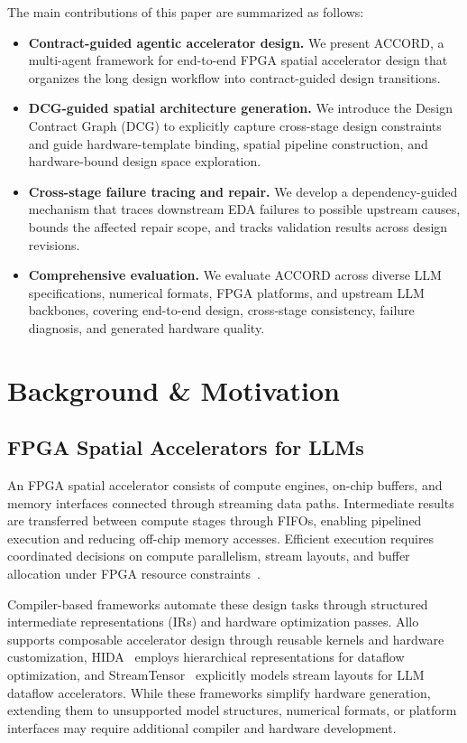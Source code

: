 \documentclass[conference]{IEEEtran}
\begin{document}
The main contributions of this paper are summarized as follows:
\begin{itemize}
\item \textbf{Contract-guided agentic accelerator design.}
We present ACCORD, a multi-agent framework for end-to-end FPGA spatial accelerator design that organizes the long design workflow into contract-guided design transitions.
\item \textbf{DCG-guided spatial architecture generation.}
We introduce the Design Contract Graph (DCG) to explicitly capture cross-stage design constraints and guide hardware-template binding, spatial pipeline construction, and hardware-bound design space exploration.
\item \textbf{Cross-stage failure tracing and repair.}
We develop a dependency-guided mechanism that traces downstream EDA failures to possible upstream causes, bounds the affected repair scope, and tracks validation results across design revisions.
\item \textbf{Comprehensive evaluation.}
We evaluate ACCORD across diverse LLM specifications, numerical formats, FPGA platforms, and upstream LLM backbones, covering end-to-end design, cross-stage consistency, failure diagnosis, and generated hardware quality.
\end{itemize}


\section{Background \& Motivation}
\subsection{FPGA Spatial Accelerators for LLMs}
An FPGA spatial accelerator consists of compute engines, on-chip buffers, and memory interfaces connected through streaming data paths. Intermediate results are transferred between compute stages through FIFOs, enabling pipelined execution and reducing off-chip memory accesses. Efficient execution requires coordinated decisions on compute parallelism, stream layouts, and buffer allocation under FPGA resource constraints~\cite{allo,streamtensor,hida}.

Compiler-based frameworks automate these design tasks through structured intermediate representations (IRs) and hardware optimization passes. Allo~\cite{allo} supports composable accelerator design through reusable kernels and hardware customization, HIDA~\cite{hida} employs hierarchical representations for dataflow optimization, and StreamTensor~\cite{streamtensor} explicitly models stream layouts for LLM dataflow accelerators. While these frameworks simplify hardware generation, extending them to unsupported model structures, numerical formats, or platform interfaces may require additional compiler and hardware development.
\end{document}
